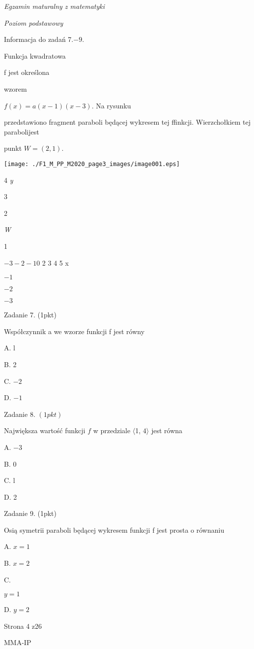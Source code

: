 \documentclass[a4paper,12pt]{article}
\begin{document}
{\it Egzamin maturalny z matematyki}

{\it Poziom podstawowy}

Informacja do zadań 7.$-9.$

Funkcja kwadratowa

f jest określona

wzorem

$f(x)=a(x-1)(x-3)$. Na rysunku

przedstawiono fragment paraboli będącej wykresem tej ffinkcji. Wierzchołkiem tej parabolijest

punkt $W=(2,1).$
\begin{center}
\texttt{[image: ./F1\_M\_PP\_M2020\_page3\_images/image001.eps]}
\end{center}
4  {\it y}

3

2

{\it W}

1

$-3  -2 -1 0$  2 3  4 5 x

$-1$

$-2$

$-3$

Zadanie 7. (1pkt)

Współczynnik a we wzorze funkcji f jest równy

A. l

B. 2

C. $-2$

D. $-1$

Zadanie 8. $(1pkt)$

Największa wartość funkcji $f$ w przedziale $\langle$1, $ 4\rangle$ jest równa

A. $-3$

B. 0

C. l

D. 2

Zadanie 9. (1pkt)

Osią symetrii paraboli będącej wykresem funkcji f jest prosta o równaniu

A. $x=1$

B. $x=2$

C.

$y=1$

D. $y=2$

Strona 4 z26

MMA-IP
\end{document}

